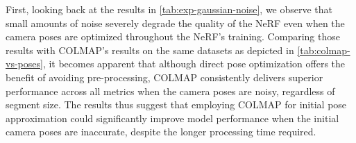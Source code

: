 \begin{comment}
\begin{table}[ht]
\centering
\setlength{\tabcolsep}{6pt}
\renewcommand{\arraystretch}{1.5}
\begin{tabular}{l | C{2.2} C{1.3} C{1.3} c}
\hline
\textbf{Description} & \textbf{PSNR $\uparrow$} & \textbf{SSIM $\uparrow$} & \textbf{LPIPS $\downarrow$} & \textbf{Time processing} \\
\hline
\multicolumn{5}{c}{Baseline segment} \\
\hline
CARLA w/o camera optimization & \cellcolor{green} 24.702831268310547 & \cellcolor{green} 0.7926456332206726 & \cellcolor{red} 0.17928948998451233  & 00:00:00 \\
CARLA w/ camera optimization & 24.197817 & 0.766733 & 0.168807 & 00:00:00 \\%
COLMAP & \cellcolor{red} 24.18618 & \cellcolor{red} 0.758549 & \cellcolor{green} 0.159935 & 01:12:15 \\%
\hline
\multicolumn{5}{c}{Shorter segment - 10\% of baseline} \\
\hline
CARLA w/o camera optimization &\cellcolor{green} 25.677803 & \cellcolor{green} 0.861634 & \cellcolor{green} 0.076989  & 00:00:00 \\
CARLA w/ camera optimization &\cellcolor{red} 24.831890 &\cellcolor{red} 0.824606 &\cellcolor{red} 0.102266 & 00:00:00 \\
COLMAP & 25.227386 & 0.8273112 & 0.0932542 & 00:02:00 \\
\hline
\end{tabular}
\caption{Results for experiments}
\label{tab:colmap-vs-poses}
\end{table}
\end{comment}


First, looking back at the results in \autoref{tab:exp-gaussian-noise}, we observe that small amounts of noise severely degrade the quality of the NeRF even when the camera poses are optimized throughout the NeRF's training. Comparing those results with COLMAP's results on the same datasets as depicted in \autoref{tab:colmap-vs-poses}, it becomes apparent that although direct pose optimization offers the benefit of avoiding pre-processing, COLMAP consistently delivers superior performance across all metrics when the camera poses are noisy, regardless of segment size. The results thus suggest that employing COLMAP for initial pose approximation could significantly improve model performance when the initial camera poses are inaccurate, despite the longer processing time required.


